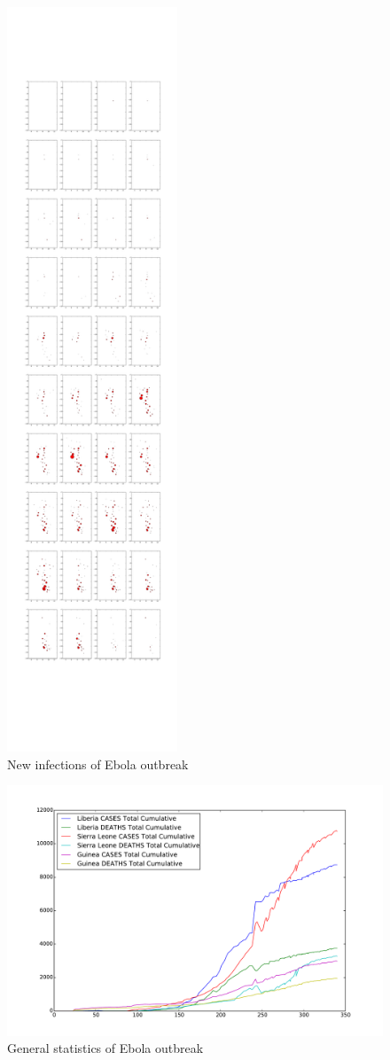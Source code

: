 \documentclass[12pt]{article}
\begin{document}
\begin{figure}[hbt]
\begin{center}
  \includegraphics[width=2in]{graph/new2.pdf}
  \caption{New infections of Ebola outbreak}
  \label{new}
\end{center}  
\end{figure}


\begin{figure}[hbt]
\begin{center}
  \includegraphics[width=6in]{graph/stats.pdf}
  \caption{General statistics of Ebola outbreak}
\end{center}  
\end{figure}



\end{document}
